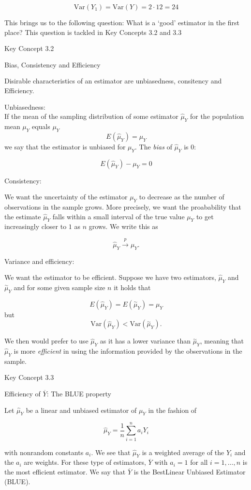 \documentclass[]{book}
\theoremstyle{definition}
\theoremstyle{definition}
\theoremstyle{definition}
\theoremstyle{remark}
\begin{document}
\[ \text{Var}(Y_1) = \text{Var}(Y) = 2 \cdot 12 = 24 \]

This brings us to the following question: What is a `good' estimator in
the first place? This question is tackled in Key Concepts 3.2 and 3.3

Key Concept 3.2

Bias, Consistency and Efficiency

Disirable characteristics of an estimator are unbiasedness, consitency
and Efficiency.

Unbiasedness:\\
If the mean of the sampling distribution of some estimator \(\hat\mu_Y\)
for the population mean \(\mu_Y\) equals \(\mu_Y\)
\[ E(\hat\mu_Y) = \mu_Y \] we say that the estimator is unbiased for
\(\mu_Y\). The \emph{bias} of \(\hat\mu_Y\) is \(0\):

\[ E(\hat\mu_Y) - \mu_Y = 0\]

Consistency:

We want the uncertainty of the estimator \(\mu_Y\) to decrease as the
number of observations in the sample grows. More precisely, we want the
proabability that the estimate \(\hat\mu_Y\) falls within a small
interval of the true value \(\mu_Y\) to get increasingly closer to \(1\)
as \(n\) grows. We write this as

\[ \hat\mu_Y \xrightarrow{p} \mu_Y. \]

Variance and efficiency:

We want the estimator to be efficient. Suppose we have two estimators,
\(\hat\mu_Y\) and \(\overset{\sim}{\mu}_Y\) and for some given sample
size \(n\) it holds that

\[ E(\hat\mu_Y) = E(\overset{\sim}{\mu}_Y) = \mu_Y \] but
\[\text{Var}(\hat\mu_Y) < \text{Var}(\overset{\sim}{\mu}_Y).\]

We then would prefer to use \(\hat\mu_Y\) as it has a lower variance
than \(\overset{\sim}{\mu}_Y\), meaning that \(\hat\mu_Y\) is more
\emph{efficient} in using the information provided by the observations
in the sample.

Key Concept 3.3

Efficiency of \(\overline{Y}\): The BLUE property

Let \(\hat\mu_Y\) be a linear and unbiased estimator of \(\mu_Y\) in the
fashion of

\[ \hat\mu_Y = \frac{1}{n} \sum_{i=1}^n a_i Y_i\]

with nonrandom constants \(a_i\). We see that \(\hat\mu_Y\) is a
weighted average of the \(Y_i\) and the \(a_i\) are weights. For these
type of estimators, \(\overline{Y}\) with \(a_i = 1\) for all
\(i = 1, \dots, n\) is the most efficient estimator. We say that
\(\overline{Y}\) is the BestLinear Unbiased Estimator (BLUE).
\end{document}
